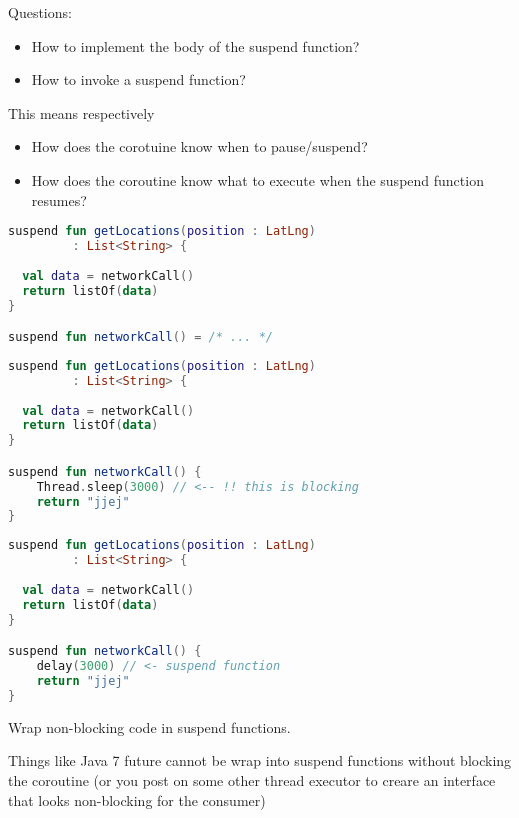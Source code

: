 \documentclass[10pt]{beamer}
\begin{document}
\begin{frame}
	Questions:
	\begin{itemize}
		\item How to implement the body of the suspend function? 
		\item How to invoke a suspend function?
	\end{itemize}
	
	This means respectively 
	\begin{itemize}
		\item How does the corotuine know when to pause/suspend?
		\item How does the coroutine know what to execute when the suspend function resumes?
	\end{itemize}
\end{frame}


\begin{frame}[fragile]
\begin{lstlisting}[language=Kotlin, basicstyle=\ttfamily]
suspend fun getLocations(position : LatLng) 
	     : List<String> {
		     
  val data = networkCall()
  return listOf(data)
}

suspend fun networkCall() = /* ... */
\end{lstlisting}
\end{frame}
\begin{frame}[fragile]
\begin{lstlisting}[language=Kotlin, basicstyle=\ttfamily]
suspend fun getLocations(position : LatLng) 
	     : List<String> {
		     
  val data = networkCall()
  return listOf(data)
}

suspend fun networkCall() {
	Thread.sleep(3000) // <-- !! this is blocking
	return "jjej"
}
\end{lstlisting}
\end{frame}
\begin{frame}[fragile]
\begin{lstlisting}[language=Kotlin, basicstyle=\ttfamily]
suspend fun getLocations(position : LatLng) 
	     : List<String> {
		     
  val data = networkCall()
  return listOf(data)
}

suspend fun networkCall() {
	delay(3000) // <- suspend function
	return "jjej"
}
\end{lstlisting}
\end{frame}
\begin{frame}
	Wrap non-blocking code in suspend functions.

	Things like Java 7 future cannot be wrap into suspend functions without blocking the coroutine (or you post on some other thread executor to creare an interface that looks non-blocking for the consumer) 
\end{frame}
\end{document}

